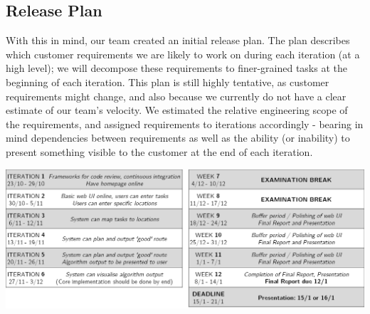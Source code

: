 \documentclass[10pt]{article}
\begin{document}
\subsection{Release Plan}
With this in mind, our team created an initial release plan. The plan describes which customer requirements we are likely to work on during each iteration (at a high level); we will decompose these requirements to finer-grained tasks at the beginning of each iteration. This plan is still highly tentative, as customer requirements might change, and also because we currently do not have a clear estimate of our team's velocity. We estimated the relative engineering scope of the requirements, and assigned requirements to iterations accordingly - bearing in mind dependencies between requirements as well as the ability (or inability) to present something visible to the customer at the end of each iteration.
\begin{center}
\includegraphics[scale=0.75]{release_plan.png}
\end{center}
\end{document}
